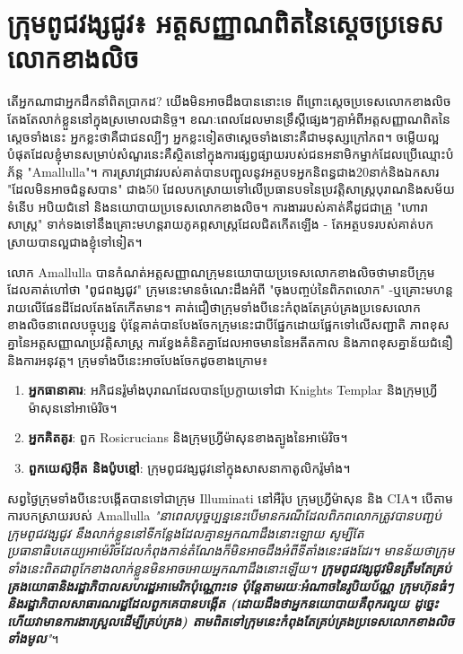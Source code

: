 \documentclass[10pt,twocolumn,letterpaper]{article}
\begin{document}
\section{ក្រុមពូជវង្សជូវ៖ អត្តសញ្ញាណពិតនៃស្តេចប្រទេសលោកខាងលិច}

	តើអ្នកណាជាអ្នកដឹកនាំពិតប្រាកដ? យើងមិនអាចដឹងបាននោះទេ ពីព្រោះ​ស្តេច​ប្រទេសលោក​ខាង​លិច​តែងតែ​លាក់​ខ្លួន​នៅក្នុង​ស្រមោលជានិច្ច។ ខណៈពេលដែលមានទ្រឹស្ដីផ្សេងៗគ្អាអំពីអត្តសញ្ញាណពិតនៃស្តេចទាំងនេះ អ្នកខ្លះថាគឺជាជនល្បីៗ អ្នកខ្លះទៀតថាស្តេចទាំងនោះគឺជាមនុស្សក្រៅភព។ ចម្លើយល្អបំផុតដែលខ្ញុំមានសម្រាប់សំណួរនេះគឺស្ថិតនៅក្នុងការផ្សព្វផ្សាយរបស់ជនអនាមិកម្នាក់ដែលប្រើឈ្មោះបំភ័ន្ត "Amallulla"។ ការស្រាវជ្រាវរបស់គាត់បានបញ្ជូលនូវអត្ថបទអ្នកនិពន្ធជាង20នាក់និងឯកសារ "ដែលមិនអាចជំនួសបាន" ជាង50 ដែលបកស្រាយទៅលើប្រធានបទនៃប្រវត្តិសាស្ត្របុរាណនិងសម័យទំនើប អបិយជំនៅ និងនយោបាយប្រទេសលោកខាងលិច\cite{33,34}។ ការងាររបស់គាត់គឺដូជជាគ្រួ "ហោរាសាស្រ្ត" ទាក់ទងទៅនឹងគ្រោះមហន្តរាយភូគព្ភសាស្ត្រដែលជិតកើតឡើង - តែអត្ថបទរបស់គាត់​\textit{} បកស្រាយបានល្អជាងខ្ញុំទៅទៀត។

	លោក Amallulla បានកំណត់អត្តសញ្ញាណក្រុមនយោបាយប្រទេសលោកខាងលិចថាមានបីក្រុម ដែលគាត់ហៅថា "ពូជពង្សជូវ" ក្រុមនេះមានចំណេះដឹងអំពី "ចុងបញ្ចប់នៃពិភពលោក" -ឬគ្រោះមហន្តរាយលើផែនដីដែលតែងតែកើតមាន។ គាត់ជឿថាក្រុមទាំងបីនេះកំពុងតែគ្រប់គ្រងប្រទេសលោកខាងលិចនាពេលបច្ចុប្បន្ន ប៉ុន្តែគាត់បានបែងចែកក្រុមនេះជាបីផ្នែកដោយផ្អែកទៅលើសញ្ជាតិ ភាពខុសគ្នានៃអត្តសញ្ញាណប្រវត្តិសាស្ត្រ ការខ្វែងគំនិតគ្នាដែលអាចមាននៃអតីតកាល និងភាពខុសគ្នាន័យជំនឿនិងការអនុវត្ត។
	ក្រុមទាំងបីនេះអាចបែងចែកដូចខាងក្រោម៖
\begin{flushleft}
\begin{enumerate}
    \item \textbf{អ្នកធានាគារ}: អភិជនរ៉ូមាំងបុរាណដែលបានប្រែក្លាយទៅជា Knights Templar និងក្រុមហ្វ្រីម៉ាសុននៅអាម៉េរិច។
    \item \textbf{អ្នកគិតគូរ}: ពួក Rosicrucians និងក្រុមហ្វ្រីម៉ាសុនខាងត្បូងនៃអាម៉េរិច។
    \item \textbf{ពួកយេស៊ូអ៊ីត និងប៉ូបខ្មៅ}: ក្រុមពូជវង្សជូវនៅក្នុងសាសនាកាតូលិករ៉ូមាំង។
\end{enumerate}
\end{flushleft}
	សព្វថ្ងៃក្រុមទាំងបីនេះបង្កើតបានទៅជាក្រុម Illuminati នៅអឺរ៉ុប ក្រុមហ្វ្រីម៉ាសុន និង CIA។ បើតាមការបកស្រាយរបស់ Amallulla \textit{"នាពេលបុច្ចប្បន្ននេះបើមានករណីដែលពិភពលោកត្រូវបានបញ្ជប់  ក្រុមពូជវង្សជូវ នឹងលាក់ខ្លួននៅទីកន្លែងដែលគ្មានអ្នកណាដឹងនោះឡោយ សូម្បីតែប្រធានាធិបតេយ្យអាម៉េរិចដែលកំពុងកាន់តំណែងក៏មិនអាចដឹងអំពីទីតាំងនេះផងដែរ។ មានន័យថាក្រុមទាំងនេះពិតជាពូកែខាងលាក់ខ្លួនមិនអាចអោយអ្នកណាដឹងនោះឡើយ។ \textbf{ក្រុមពូជវង្សជូវមិនត្រឹមតែគ្រប់គ្រងយោធានិងរដ្ឋាភិបាលសហរដ្ឋអាមេរិកប៉ុណ្ណោះទេ ប៉ុន្តែតាមរយៈអំណាចនៃរូបិយប័ណ្ណ ក្រុមហ៊ុនធំៗ និងរដ្ឋាភិបាលសាធារណរដ្ឋដែលពួកគេបានបង្កើត (ដោយដឹងថាអ្នកនយោបាយគឺពុករលួយ ដូច្នេះហើយវាមានការងារស្រួលដើម្បីគ្រប់គ្រង) តាមពិតទៅក្រុមនេះកំពុងតែគ្រប់គ្រងប្រទេសលោកខាងលិចទាំងមូល}"}\cite{33,34}។
\end{document}
